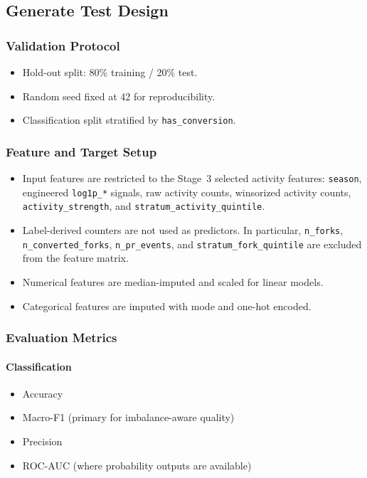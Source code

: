 \subsection{Generate Test Design}

\subsubsection{Validation Protocol}

\begin{itemize}
    \item Hold-out split: 80\% training / 20\% test.
    \item Random seed fixed at 42 for reproducibility.
    \item Classification split stratified by \texttt{has\_conversion}.
\end{itemize}

\subsubsection{Feature and Target Setup}

\begin{itemize}
    \item Input features are restricted to the Stage~3 selected activity features: \texttt{season}, engineered \texttt{log1p\_*} signals, raw activity counts, winsorized activity counts, \texttt{activity\_strength}, and \texttt{stratum\_activity\_quintile}.
    \item Label-derived counters are not used as predictors. In particular, \texttt{n\_forks}, \texttt{n\_converted\_forks}, \texttt{n\_pr\_events}, and \texttt{stratum\_fork\_quintile} are excluded from the feature matrix.
    \item Numerical features are median-imputed and scaled for linear models.
    \item Categorical features are imputed with mode and one-hot encoded.
\end{itemize}

\subsubsection{Evaluation Metrics}

\paragraph{Classification}
\begin{itemize}
    \item Accuracy
    \item Macro-F1 (primary for imbalance-aware quality)
    \item Precision
    \item ROC-AUC (where probability outputs are available)
\end{itemize}

